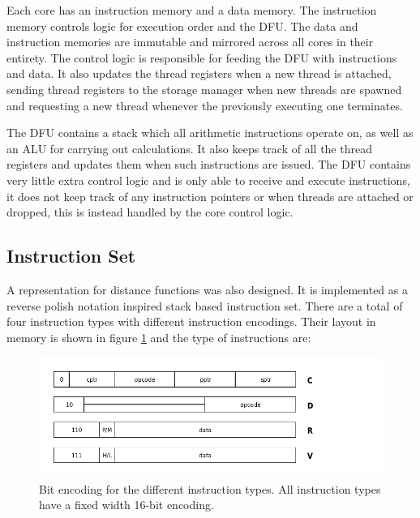 			Each core has an instruction memory and a data memory. The
			instruction memory controls logic for execution order and the DFU.
			The data and instruction memories are immutable and mirrored across
			all cores in their entirety. The control logic is responsible for
			feeding the DFU with instructions and data. It also updates the
			thread registers when a new thread is attached, sending thread
			registers to the storage manager when new threads are spawned and
			requesting a new thread whenever the previously executing one
			terminates.
			
			The DFU contains a stack which all arithmetic instructions operate
			on, as well as an ALU for carrying out calculations. It also keeps
			track of all the thread registers and updates them when such
			instructions are issued. The DFU contains very little extra control
			logic and is only able to receive and execute instructions, it does
			not keep track of any instruction pointers or when threads are
			attached or dropped, this is instead handled by the core control
			logic.

		\subsection{Instruction Set}

			A representation for distance functions was also designed. It is
			implemented as a reverse polish notation inspired stack based instruction
			set. There are a total of four instruction types with different
			instruction encodings. Their layout in memory is shown in figure
			\ref{encodingfig} and the type of instructions are:

			\begin{figure}
				\centering
				\caption{Bit encoding for the different instruction types. All
					instruction types have a fixed width 16-bit encoding.}
				\label{encodingfig}
				\includegraphics[width=0.75\linewidth]{figure/pdf/instruction_layout} 
			\end{figure}

